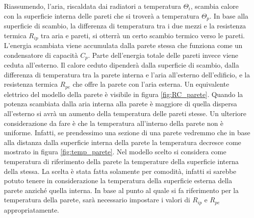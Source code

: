\documentclass[laurea,oneside,11pt]{USiena_tesiLM}
\begin{document}
Riassumendo, l'aria, riscaldata dai radiatori a temperatura $\Theta_i$, scambia calore con la superficie interna delle pareti che si troverà a temperatura $\Theta_p$. In base alla superficie di scambio, la differenza di temperatura tra i due mezzi e la resistenza termica $R_{ip}$ tra aria e pareti, si otterrà un certo scambio termico verso le pareti. L'energia scambiata viene accumulata dalla parete stessa che funziona come un condensatore di capacità $C_p$. Parte dell'energia totale delle pareti invece viene ceduta all'esterno. Il calore ceduto dipenderà dalla superficie di scambio, dalla differenza di temperatura tra la parete interna e l'aria all'esterno dell'edificio, e la resistenza termica $R_{pe}$ che offre la parete con l'aria esterna.  Un equivalente elettrico del modello della parete è visibile in figura \ref{fig:RC_parete}.
Quando la potenza scambiata dalla aria interna alla parete è maggiore di quella dispersa all'esterno si avrà un aumento della temperatura delle pareti stesse.
Un ulteriore considerazione da fare è che la temperatura all'interno della parete non è uniforme. Infatti, se prendessimo una sezione di una parete vedremmo che in base alla distanza dalla superficie interna della parete la temperatura decresce come mostrato in figura \ref{fig:temp_parete}.  Nel modello scelto si considera come temperatura di riferimento della parete la temperature della superficie interna della stessa. La scelta è stata fatta solamente per comodità, infatti si sarebbe potuto tenere in considerazione la temperatura della superficie esterna della parete anziché quella interna. In base al punto al quale si fa riferimento per la temperatura della parete, sarà necessario impostare  i valori di $R_{ip}$ e $R_{pe}$ appropriatamente.   
\end{document}

